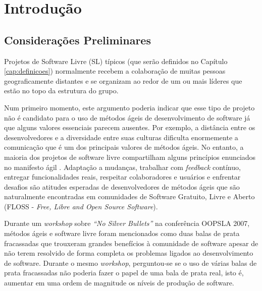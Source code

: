 \chapter{Introdução}
\label{cap:introducao}

\section{Considerações Preliminares}
\label{sec:consideracoes_preliminares}

Projetos de Software Livre (SL) típicos (que serão definidos no
Capítulo \ref{cap:definicoes}) normalmente recebem a colaboração de
muitas pessoas geograficamente distantes \cite{Dempsey1999} e se
organizam ao redor de um ou mais líderes que estão no topo da
estrutura do grupo.

Num primeiro momento, este argumento poderia indicar que esse tipo de
projeto não é candidato para o uso de métodos ágeis de desenvolvimento
de software já que alguns valores essenciais parecem ausentes. Por
exemplo, a distância entre os desenvolvedores e a diversidade entre
suas culturas dificulta enormemente a comunicação que é um dos
principais valores de métodos ágeis. No entanto, a maioria dos
projetos de software livre compartilham alguns princípios enunciados
no manifesto ágil \cite{AgileManifesto}. Adaptação a mudanças,
trabalhar com \emph{feedback} contínuo, entregar funcionalidades
reais, respeitar colaboradores e usuários e enfrentar desafios são
atitudes esperadas de desenvolvedores de métodos ágeis que são
naturalmente encontradas em comunidades de Software Gratuito, Livre e
Aberto (FLOSS - \emph{Free, Libre and Open Source Software}).

Durante um \emph{workshop} \cite{OOPSLA07} sobre \emph{``No Silver
  Bullets''} \cite{Brooks1987} na conferência OOPSLA 2007, métodos
ágeis e software livre foram mencionados como duas balas de prata
fracassadas que trouxeram grandes benefícios à comunidade de software
apesar de não terem resolvido de forma completa os problemas ligados
ao desenvolvimento de software. Durante o mesmo \emph{workshop},
perguntou-se se o uso de várias balas de prata fracassadas não poderia
fazer o papel de uma bala de prata real, isto é, aumentar em uma ordem
de magnitude os níveis de produção de software.

